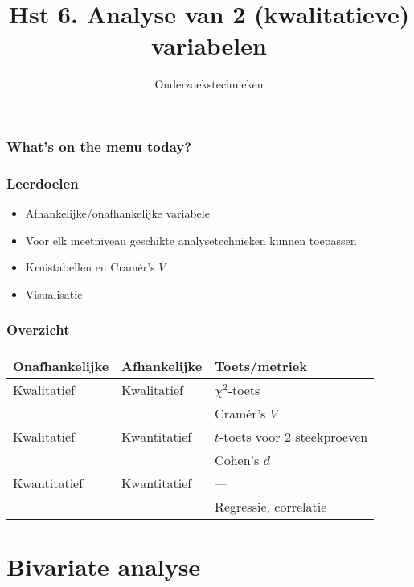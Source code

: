 \documentclass[aspectratio=169]{beamer}
\title{Hst 6. Analyse van 2 (kwalitatieve) variabelen}
\subtitle{Onderzoekstechnieken}
\begin{document}
\begin{frame}
  \maketitle
\end{frame}

\begin{frame}
  \frametitle{What's on the menu today?}
  
  \tableofcontents
\end{frame}

\begin{frame}
  \frametitle{Leerdoelen}
  
  \begin{itemize}
    \item Afhankelijke/onafhankelijke variabele
    \item Voor elk meetniveau geschikte analysetechnieken kunnen toepassen
    \item Kruistabellen en Cramér's $V$
    \item Visualisatie
  \end{itemize}
\end{frame}

\begin{frame}
  \frametitle{Overzicht}
    \centering
    \begin{tabular}{lll}
    	\toprule
    	\textbf{Onafhankelijke} & \textbf{Afhankelijke} & \textbf{Toets/metriek}        \\
    	\midrule
    	Kwalitatief             & Kwalitatief           & $\chi^2$-toets                \\
    	                        &                       & Cramér's $V$                  \\
    	Kwalitatief             & Kwantitatief          & $t$-toets voor 2 steekproeven \\
    	                        &                       & Cohen's $d$                   \\
    	Kwantitatief            & Kwantitatief          & ---                           \\
    	                        &                       & Regressie, correlatie         \\
    	\bottomrule
    \end{tabular}
\end{frame}

\section{Bivariate analyse}
\end{document}
